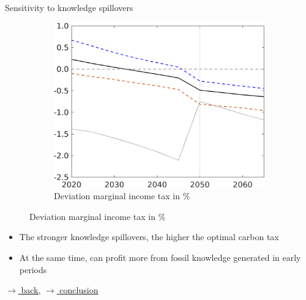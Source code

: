\documentclass[11pt,aspectratio=169]{beamer}
\begin{document}
\begin{frame}{Sensitivity to knowledge spillovers}
\begin{figure}[h!!]
				\begin{subfigure}{0.42\textwidth}		
					\caption{ Deviation marginal income tax in \%}
					\includegraphics[width=1\textwidth]{../codding_model/own_basedOnFried/optimalPol_010922_revision/figures/all_13Sept22/NewCalib_Sens_TvsNoT_dTaulAv_emnet1_Sun2_spillover0_knspil3_xgr0_nsk0_sep0_extern0_PV1_etaa0.79_lgd0.png}
				\end{subfigure}
			\end{figure}
			\vspace{2mm}
			\begin{block}{}
				\begin{itemize}
					\item The stronger knowledge spillovers, the higher the optimal carbon tax
					\item At the same time, can profit more from fossil knowledge generated in early periods
				\end{itemize}
			\end{block}	
			
			\vspace{-4mm}
			\hfill
			\hyperlink{backmec}{\tiny{$\rightarrow$ back,}}	\hyperlink{conc}{\tiny{$\rightarrow$ conclusion}}
		\end{frame}
	
	
	
\end{document}

